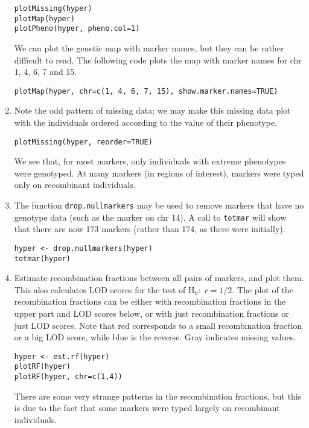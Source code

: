 \documentclass[10pt,letterpaper]{article}
\newcommand{\usercolor}{\color [named]{BlueViolet}}
\begin{document}
\begin{enumerate}
\usercolor 
\verb|plotMissing(hyper)| \\
\verb|plotMap(hyper)| \\
\verb|plotPheno(hyper, pheno.col=1)| %
\normalcolor

We can plot the genetic map with marker names, but they can be rather
difficult to read.  The following code plots the map with marker names
for chr 1, 4, 6, 7 and 15.

\usercolor
\verb|plotMap(hyper, chr=c(1, 4, 6, 7, 15), show.marker.names=TRUE)|
\normalcolor

\item Note the odd pattern of missing data; we may make this missing
data plot with the individuals ordered according to the value of their
phenotype.

\usercolor 
\verb|plotMissing(hyper, reorder=TRUE)| 
\normalcolor

We see that, for most markers, only individuals with extreme
phenotypes were genotyped.  At many markers (in regions of interest),
markers were typed only on recombinant individuals.

\item The function \verb-drop.nullmarkers- may be used to remove
markers that have no genotype data (such as the marker on chr
14).  A call to \verb-totmar- will show that there are now 173 markers
(rather than 174, as there were initially).  

\usercolor
\verb|hyper <- drop.nullmarkers(hyper)| \\
\verb|totmar(hyper)| \normalcolor

\item Estimate recombination fractions between all pairs of markers,
and plot them. This also calculates LOD scores for the test of
H$_0{:} \; r=1/2$.  The plot of the recombination fractions can be
either with recombination fractions in the upper part and LOD scores
below, or with just recombination fractions or just LOD scores.  Note
that red corresponds to a small recombination fraction or a big LOD
score, while blue is the reverse.  Gray indicates missing values.

\usercolor \verb|hyper <- est.rf(hyper)| \\
\verb|plotRF(hyper)| \\
\verb|plotRF(hyper, chr=c(1,4))| \normalcolor

There are some very strange patterns in the recombination fractions,
but this is due to the fact that some markers were typed largely on
recombinant individuals.


\end{enumerate}
\end{document}
